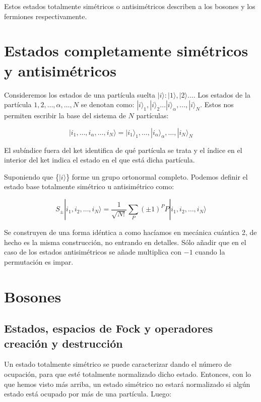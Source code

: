\documentclass{article} %
\begin{document}
Estos estados totalmente simétricos o antisimétricos describen a los bosones y los fermiones respectivamente.

\section{Estados completamente simétricos y antisimétricos}

Consideremos los estados de una partícula suelta $|i\rangle : |1\rangle, |2\rangle \ldots$. Los estados de la partícula $1, 2, \ldots, \alpha, \ldots, N$ se denotan como: $|i\rangle_1, |i\rangle_2 \ldots |i\rangle_{\alpha}, \ldots, |i\rangle_N$. Estos nos permiten escribir la base del sistema de $N$ partículas:

$$
|i_1, \ldots, i_{\alpha}, \ldots, i_N \rangle = |i_1\rangle_1, \ldots, |i_{\alpha} \rangle_{\alpha}, \ldots, |i_N\rangle_N
$$

El subíndice fuera del ket identifica de qué partícula se trata y el índice en el interior del ket indica el estado en el que está dicha partícula.

Suponiendo que \{$|i\rangle$\} forme un grupo ortonormal completo. Podemos definir el estado base totalmente simétrico u antisimétrico como:

\begin{equation}
S_{\pm} |i_1, i_2, \ldots, i_N \rangle = \frac{1}{\sqrt{N!}} \sum_P (\pm 1)^P P |i_1, i_2, \ldots, i_N \rangle
\end{equation}

Se construyen de una forma idéntica a como hacíamos en mecánica cuántica 2, de hecho es la misma construcción, no entrando en detalles. Sólo añadir que en el caso de los estados antisimétricos se añade multiplica con $-1$ cuando la permutación es impar.

\section{Bosones}

\subsection{Estados, espacios de Fock y operadores creación y destrucción}

Un estado totalmente simétrico se puede caracterizar dando el número de ocupación, para que esté totalmente normalizado dicho estado. Entonces, con lo que hemos visto más arriba, un estado simétrico no estará normalizado si algún estado está ocupado por más de una partícula. Luego:
\end{document}
